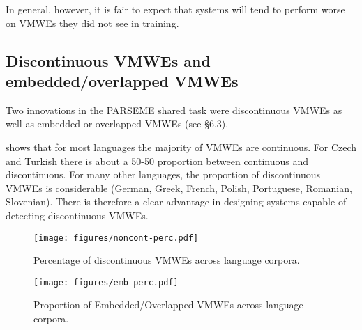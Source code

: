 \documentclass[output=paper
,modfonts
,nonflat,draftmode]{langsci/langscibook}
\begin{document}



 In general, however, it is fair to expect that systems will tend to perform worse on VMWEs they did not see in training.  


\subsection{Discontinuous VMWEs and embedded/overlapped VMWEs}

Two innovations in the PARSEME shared task were discontinuous VMWEs as well as embedded or overlapped VMWEs (see  §6.3).

 shows that for most languages the majority of VMWEs are continuous. For Czech and Turkish there is about a 50-50 proportion between continuous and discontinuous. For many other languages, the proportion of discontinuous VMWEs is considerable (German, Greek, French, Polish, Portuguese, Romanian, Slovenian). There is therefore a clear advantage in designing systems capable of detecting discontinuous VMWEs.

\begin{figure}
\texttt{[image: figures/noncont-perc.pdf]}
\caption{\label{fig:cont}Percentage of discontinuous VMWEs across language corpora.}
\end{figure}

\begin{figure}
\texttt{[image: figures/emb-perc.pdf]}
\caption{\label{fig:embedded}Proportion of Embedded/Overlapped VMWEs across language corpora.}
\end{figure}
\end{document}
